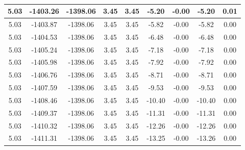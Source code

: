 \begin{table}[htbp]
\begin{adjustbox}{angle=90}
\begin{tabular}{|c|c|c|c|c|c|c|c|c|}
 5.03 & -1403.26 & -1398.06 & 3.45 & 3.45 & -5.20 & -0.00 & -5.20 & 0.01\\ \hline
 5.03 & -1403.87 & -1398.06 & 3.45 & 3.45 & -5.82 & -0.00 & -5.82 & 0.00\\ \hline
 5.03 & -1404.53 & -1398.06 & 3.45 & 3.45 & -6.48 & -0.00 & -6.48 & 0.00\\ \hline
 5.03 & -1405.24 & -1398.06 & 3.45 & 3.45 & -7.18 & -0.00 & -7.18 & 0.00\\ \hline
 5.03 & -1405.98 & -1398.06 & 3.45 & 3.45 & -7.92 & -0.00 & -7.92 & 0.00\\ \hline
 5.03 & -1406.76 & -1398.06 & 3.45 & 3.45 & -8.71 & -0.00 & -8.71 & 0.00\\ \hline
 5.03 & -1407.59 & -1398.06 & 3.45 & 3.45 & -9.53 & -0.00 & -9.53 & 0.00\\ \hline
 5.03 & -1408.46 & -1398.06 & 3.45 & 3.45 & -10.40 & -0.00 & -10.40 & 0.00\\ \hline
 5.03 & -1409.37 & -1398.06 & 3.45 & 3.45 & -11.31 & -0.00 & -11.31 & 0.00\\ \hline
 5.03 & -1410.32 & -1398.06 & 3.45 & 3.45 & -12.26 & -0.00 & -12.26 & 0.00\\ \hline
 5.03 & -1411.31 & -1398.06 & 3.45 & 3.45 & -13.25 & -0.00 & -13.26 & 0.00\\ \hline
            \end{tabular}
        \end{adjustbox}
        \caption{}
        \label{}
    \end{table}
    